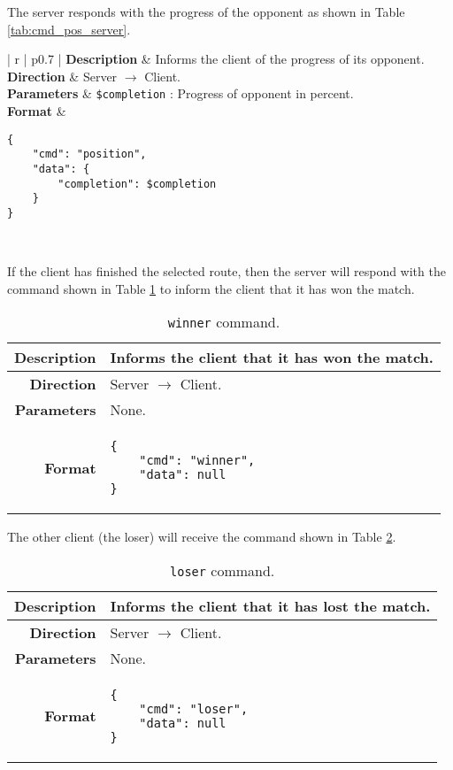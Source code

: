 The server responds with the progress of the opponent as shown in Table \ref{tab:cmd_pos_server}.

\begin{table}[!ht]
	\centering
	\begin{tabular}{| r | p{} |}
		\hline
		\textbf{Description} & Informs the client of the progress of its opponent. \\ \hline
		\textbf{Direction} & Server $\rightarrow$ Client. \\ \hline
		\textbf{Parameters} & \texttt{\$completion} : Progress of opponent in percent. \\ \hline
		\textbf{Format} &
\begin{lstlisting}[language=Command]
{
	"cmd": "position",
	"data": {
		"completion": $completion
	}
}
\end{lstlisting}
		\\ \hline
	\end{tabular}
	\caption{\texttt{position} command (server).}
	\label{tab:cmd_pos_server}
\end{table}

If the client has finished the selected route, then the server will respond with the command shown in Table \ref{tab:cmd_winner} to inform the client that it has won the match.

\begin{table}[!ht]
	\centering
	\begin{tabular}{| r | p{} |}
		\hline
		\textbf{Description} & Informs the client that it has won the match. \\ \hline
		\textbf{Direction} & Server $\rightarrow$ Client. \\ \hline
		\textbf{Parameters} & None. \\ \hline
		\textbf{Format} &
\begin{lstlisting}[language=Command]
{
	"cmd": "winner",
	"data": null
}
\end{lstlisting}
		\\ \hline
	\end{tabular}
	\caption{\texttt{winner} command.}
	\label{tab:cmd_winner}
\end{table}

The other client (the loser) will receive the command shown in Table \ref{tab:cmd_loser}.

\begin{table}[!ht]
	\centering
	\begin{tabular}{| r | p{} |}
		\hline
		\textbf{Description} & Informs the client that it has lost the match. \\ \hline
		\textbf{Direction} & Server $\rightarrow$ Client. \\ \hline
		\textbf{Parameters} & None. \\ \hline
		\textbf{Format} &
\begin{lstlisting}[language=Command]
{
	"cmd": "loser",
	"data": null
}
\end{lstlisting}
		\\ \hline
	\end{tabular}
	\caption{\texttt{loser} command.}
	\label{tab:cmd_loser}
\end{table}
